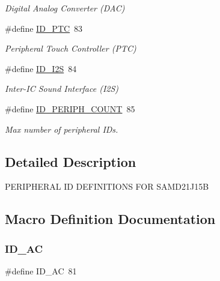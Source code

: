 \begin{DoxyCompactItemize}
\begin{DoxyCompactList}\small\item\em Digital Analog Converter (D\+AC) \end{DoxyCompactList}\item 
\#define \mbox{\hyperlink{group___s_a_m_d21_j15_b__id_ga6ce249818b3ff70438a4eff92e49d38e}{I\+D\+\_\+\+P\+TC}}~83
\begin{DoxyCompactList}\small\item\em Peripheral Touch Controller (P\+TC) \end{DoxyCompactList}\item 
\#define \mbox{\hyperlink{group___s_a_m_d21_j15_b__id_gac57cc3843ee128de44e5f43b5a272357}{I\+D\+\_\+\+I2S}}~84
\begin{DoxyCompactList}\small\item\em Inter-\/\+IC Sound Interface (I2S) \end{DoxyCompactList}\item 
\#define \mbox{\hyperlink{group___s_a_m_d21_j15_b__id_gad0762589e782b5eca161d9d344306da7}{I\+D\+\_\+\+P\+E\+R\+I\+P\+H\+\_\+\+C\+O\+U\+NT}}~85
\begin{DoxyCompactList}\small\item\em Max number of peripheral I\+Ds. \end{DoxyCompactList}\end{DoxyCompactItemize}


\subsection{Detailed Description}
P\+E\+R\+I\+P\+H\+E\+R\+AL ID D\+E\+F\+I\+N\+I\+T\+I\+O\+NS F\+OR S\+A\+M\+D21\+J15B 

\subsection{Macro Definition Documentation}
\mbox{\label{group___s_a_m_d21_j15_b__id_ga20fe08f8d0b2a4e6c0dbb2371aacadb0}} 
\subsubsection{\texorpdfstring{ID\_AC}{ID\_AC}}
{\footnotesize\ttfamily \#define I\+D\+\_\+\+AC~81}



